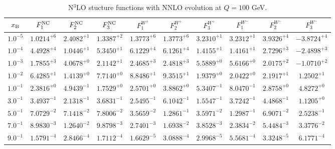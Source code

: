 \begin{table}[h]
\begin{adjustbox}{width=\textwidth}
\begin{tabular}{|c||c|c|c|c|c|c|c|c|c|}
\hline
$x_{\rm B}$ & $F_1^{\rm NC}$ & $F_2^{\rm NC}$ & $F_3^{\rm NC}$ & $F_1^{W^+}$ & $F_2^{W^+}$ & $F_3^{W^+}$ & $F_1^{W^-}$ & $F_2^{W^-}$ & $F_3^{W^-}$ \\
\hline
$ 1.0^{-5}$ & $ 1.0214^{+6}$ & $ 2.4082^{+1}$ & $ 1.3387^{+2}$ & $ 1.3773^{+6}$ & $ 1.3773^{+6}$ & $ 3.2310^{+1}$ & $ 3.2312^{+1}$ & $ 3.9326^{+4}$ & $-3.8724^{+4}$ \\
$ 1.0^{-4}$ & $ 4.4928^{+4}$ & $ 1.0446^{+1}$ & $ 5.3450^{+1}$ & $ 6.1229^{+4}$ & $ 6.1261^{+4}$ & $ 1.4155^{+1}$ & $ 1.4161^{+1}$ & $ 2.7296^{+3}$ & $-2.4898^{+3}$ \\
$ 1.0^{-3}$ & $ 1.7855^{+3}$ & $ 4.0678^{+0}$ & $ 2.1142^{+1}$ & $ 2.4685^{+3}$ & $ 2.4818^{+3}$ & $ 5.5889^{+0}$ & $ 5.6166^{+0}$ & $ 2.0175^{+2}$ & $-1.0710^{+2}$ \\
$ 1.0^{-2}$ & $ 6.4285^{+1}$ & $ 1.4139^{+0}$ & $ 7.7140^{+0}$ & $ 8.8486^{+1}$ & $ 9.3515^{+1}$ & $ 1.9379^{+0}$ & $ 2.0422^{+0}$ & $ 2.1917^{+1}$ & $ 1.2502^{+1}$ \\
$ 1.0^{-1}$ & $ 2.3816^{+0}$ & $ 4.9439^{-1}$ & $ 1.7529^{+0}$ & $ 2.5701^{+0}$ & $ 3.8862^{+0}$ & $ 5.3407^{-1}$ & $ 8.0470^{-1}$ & $ 2.8758^{+0}$ & $ 4.8272^{+0}$ \\
$ 3.0^{-1}$ & $ 3.4937^{-1}$ & $ 2.1318^{-1}$ & $ 3.6831^{-1}$ & $ 2.5495^{-1}$ & $ 6.1042^{-1}$ & $ 1.5547^{-1}$ & $ 3.7242^{-1}$ & $ 4.4868^{-1}$ & $ 1.1205^{+0}$ \\
$ 5.0^{-1}$ & $ 7.0729^{-2}$ & $ 7.1418^{-2}$ & $ 7.8006^{-2}$ & $ 3.5659^{-2}$ & $ 1.2861^{-1}$ & $ 3.5971^{-2}$ & $ 1.2987^{-1}$ & $ 6.9071^{-2}$ & $ 2.5238^{-1}$ \\
$ 7.0^{-1}$ & $ 8.9830^{-3}$ & $ 1.2640^{-2}$ & $ 9.8798^{-3}$ & $ 2.7401^{-3}$ & $ 1.6938^{-2}$ & $ 3.8528^{-3}$ & $ 2.3834^{-2}$ & $ 5.4484^{-3}$ & $ 3.3776^{-2}$ \\
$ 9.0^{-1}$ & $ 1.5791^{-4}$ & $ 2.8466^{-4}$ & $ 1.7112^{-4}$ & $ 1.6629^{-5}$ & $ 3.0888^{-4}$ & $ 2.9968^{-5}$ & $ 5.5681^{-4}$ & $ 3.3248^{-5}$ & $ 6.1771^{-4}$ \\
\hline
\end{tabular}
\end{adjustbox}\caption{N$^{3}$LO stucture functions with NNLO evolution at $Q = 100$ GeV.}
\label{tab:N3LO-Q100}
\end{table}


